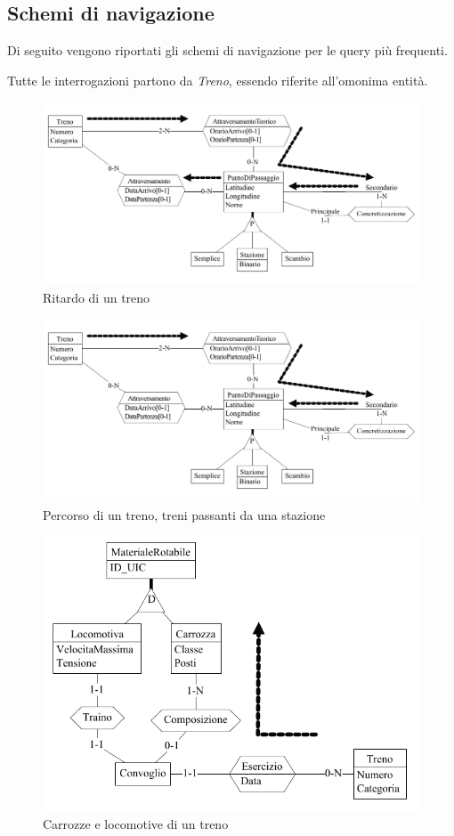 \documentclass[a4paper,12pt]{report}
\begin{document}
	\subsection{Schemi di navigazione}
	\par Di seguito vengono riportati gli schemi di navigazione per le query più frequenti.
	\par Tutte le interrogazioni partono da \textit{Treno}, essendo riferite all'omonima entità.
	\begin{figure}[H]
		\begin{center}
		\includegraphics[width=.65\linewidth]{res/accesso/ritardo}
		\end{center}
		\caption{Ritardo di un treno}
	\end{figure}
	\begin{figure}[H]
		\begin{center}
		\includegraphics[width=.65\linewidth]{res/accesso/percorso}
		\end{center}
		\caption{Percorso di un treno, treni passanti da una stazione}
	\end{figure}
	\begin{figure}[H]
		\begin{center}
		\includegraphics[width=.55\linewidth]{res/accesso/composizione}
		\end{center}
		\caption{Carrozze e locomotive di un treno}
	\end{figure}
\end{document}
